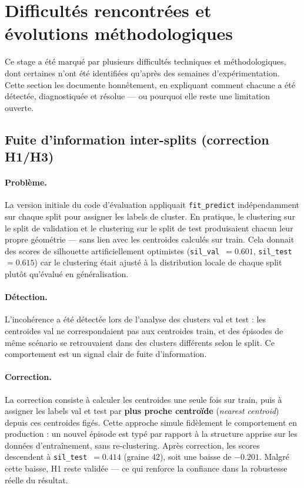 
\section{Difficultés rencontrées et évolutions méthodologiques}
\label{sec:difficulties}

Ce stage a été marqué par plusieurs difficultés techniques et méthodologiques, dont
certaines n'ont été identifiées qu'après des semaines d'expérimentation. Cette section
les documente honnêtement, en expliquant comment chacune a été détectée, diagnostiquée
et résolue --- ou pourquoi elle reste une limitation ouverte.

\subsection{Fuite d'information inter-splits (correction H1/H3)}
\label{sec:diff_leakage}

\paragraph{Problème.}
La version initiale du code d'évaluation appliquait \texttt{fit\_predict} indépendamment
sur chaque split pour assigner les labels de cluster. En pratique, le clustering
sur le split de validation et le clustering sur le split de test produisaient chacun leur
propre géométrie --- sans lien avec les centroides calculés sur train.
Cela donnait des scores de silhouette artificiellement optimistes
(\texttt{sil\_val}~$= 0.601$, \texttt{sil\_test}~$= 0.615$) car le clustering était
ajusté à la distribution locale de chaque split plutôt qu'évalué en généralisation.

\paragraph{Détection.}
L'incohérence a été détectée lors de l'analyse des clusters val et test : les centroides
val ne correspondaient pas aux centroides train, et des épisodes de même scénario
se retrouvaient dans des clusters différents selon le split. Ce comportement est un
signal clair de fuite d'information.

\paragraph{Correction.}
La correction consiste à calculer les centroides une seule fois sur train, puis à
assigner les labels val et test par \textbf{plus proche centroïde} (\emph{nearest centroid})
depuis ces centroides figés. Cette approche simule fidèlement le comportement en
production : un nouvel épisode est typé par rapport à la structure apprise sur les
données d'entraînement, sans re-clustering.
Après correction, les scores descendent à \texttt{sil\_test}~$= 0.414$ (graine 42),
soit une baisse de $-0.201$. Malgré cette baisse, H1 reste validée --- ce qui renforce
la confiance dans la robustesse réelle du résultat.

